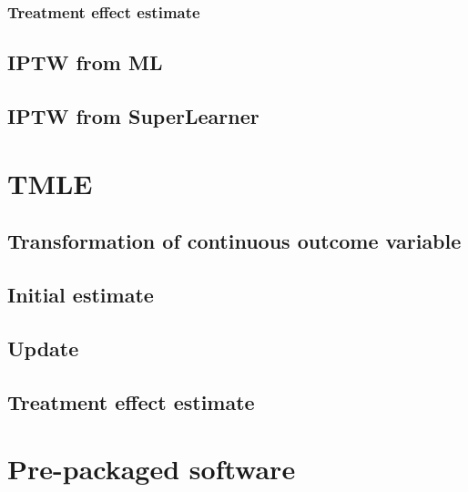 \documentclass[
]{book}
\begin{document}
\hypertarget{treatment-effect-estimate-3}{%
\subsection{Treatment effect estimate}\label{treatment-effect-estimate-3}}

\hypertarget{iptw-from-ml}{%
\section{IPTW from ML}\label{iptw-from-ml}}

\hypertarget{iptw-from-superlearner}{%
\section{IPTW from SuperLearner}\label{iptw-from-superlearner}}

\hypertarget{tmle}{%
\chapter{TMLE}\label{tmle}}

\hypertarget{transformation-of-continuous-outcome-variable}{%
\section{Transformation of continuous outcome variable}\label{transformation-of-continuous-outcome-variable}}

\hypertarget{initial-estimate}{%
\section{Initial estimate}\label{initial-estimate}}

\hypertarget{update}{%
\section{Update}\label{update}}

\hypertarget{treatment-effect-estimate-4}{%
\section{Treatment effect estimate}\label{treatment-effect-estimate-4}}

\hypertarget{pre-packaged-software}{%
\chapter{Pre-packaged software}\label{pre-packaged-software}}
\end{document}
